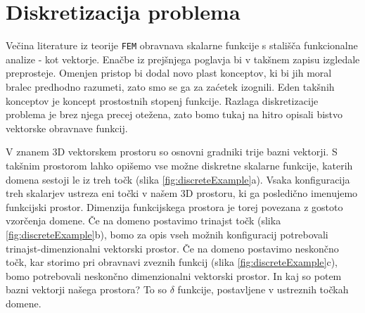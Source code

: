 \section{Diskretizacija problema}

Večina literature iz teorije \texttt{FEM} obravnava skalarne funkcije s stališča funkcionalne analize - kot vektorje. Enačbe iz prejšnjega poglavja bi v takšnem zapisu izgledale preprosteje. Omenjen pristop bi dodal novo plast konceptov, ki bi jih moral bralec predhodno razumeti, zato smo se ga za zaćetek izognili. Eden takšnih konceptov je koncept prostostnih stopenj funkcije. Razlaga diskretizacije problema je brez njega precej otežena, zato bomo tukaj na hitro opisali bistvo vektorske obravnave funkcij.

V znanem 3D vektorskem prostoru so osnovni gradniki trije bazni vektorji. S takšnim prostorom lahko opišemo vse možne diskretne skalarne funkcije, katerih domena sestoji le iz treh točk (slika \ref{fig:discreteExample}a). Vsaka konfiguracija treh skalarjev ustreza eni točki v našem 3D prostoru, ki ga posledično imenujemo funkcijski prostor. Dimenzija funkcijskega prostora je torej povezana z gostoto vzorčenja domene. Če na domeno postavimo trinajst točk (slika \ref{fig:discreteExample}b), bomo za opis vseh možnih konfiguracij potrebovali trinajst-dimenzionalni vektorski prostor. Če na domeno postavimo neskončno točk, kar storimo pri obravnavi zveznih funkcij (slika \ref{fig:discreteExample}c), bomo potrebovali neskončno dimenzionalni vektorski prostor. In kaj so potem bazni vektorji našega prostora? To so $\delta$ funkcije, postavljene v ustreznih točkah domene.

